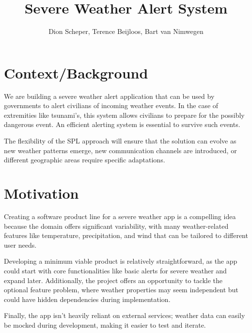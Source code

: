 \documentclass[]{article}
\title{Severe Weather Alert System}
\author{Dion Scheper, Terence Beijloos, Bart van Nimwegen}
\begin{document}
\maketitle

\section{Context/Background}
We are building a severe weather alert application that can be used by governments to alert civilians of incoming weather events. In the case of extremities like tsunami's, this system allows civilians to prepare for the possibly dangerous event. An efficient alerting system is essential to survive such events.

The flexibility of the SPL approach will ensure that the solution can evolve as new weather patterns emerge, new communication channels are introduced, or different geographic areas require specific adaptations.

\section{Motivation}
Creating a software product line for a severe weather app is a compelling idea because the domain offers significant variability, with many weather-related features like temperature, precipitation, and wind that can be tailored to different user needs. 

Developing a minimum viable product is relatively straightforward, as the app could start with core functionalities like basic alerts for severe weather and expand later. Additionally, the project offers an opportunity to tackle the optional feature problem, where weather properties may seem independent but could have hidden dependencies during implementation. 

Finally, the app isn't heavily reliant on external services; weather data can easily be mocked during development, making it easier to test and iterate.
\end{document}
